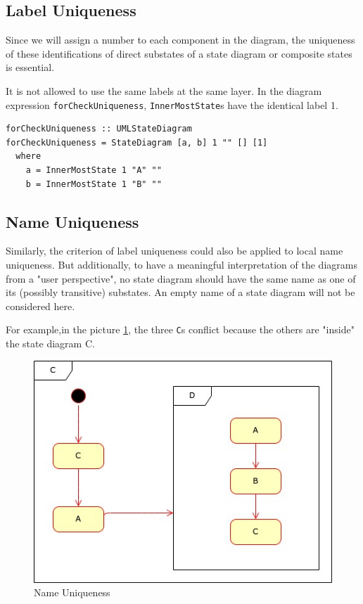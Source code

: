 \subsection{Label Uniqueness}
\label{sec:representation}
Since we will assign a number to each component in the diagram, the uniqueness of these identifications of direct substates of a state diagram or composite states is essential.

It is not allowed to use the same labels at the same layer. In the diagram expression \verb|forCheckUniqueness|, \verb|InnerMostState|s have the identical label 1.
\begin{verbatim}
forCheckUniqueness :: UMLStateDiagram
forCheckUniqueness = StateDiagram [a, b] 1 "" [] [1]
  where
    a = InnerMostState 1 "A" ""
    b = InnerMostState 1 "B" "" 
\end{verbatim}



\subsection{Name Uniqueness}
\label{sec:representation}
Similarly, the criterion of label uniqueness could also be applied to local name uniqueness.
But additionally, to have a meaningful interpretation of the diagrams from a "user perspective", no state diagram should have the same name as one of its (possibly transitive) substates. 
An empty name of a state diagram will not be considered here.

For example,in the picture \ref{fig:nameUniq}, the three \verb|C|s conflict because the others are "inside"  the state diagram C.

\begin{figure}[ht]
    \centering
    \includegraphics[scale=0.50]{Bilder/nameUniq.jpg}
    \caption{Name Uniqueness}
    \label{fig:nameUniq}
\end{figure}

